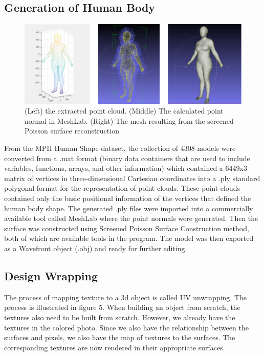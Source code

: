 \documentclass{article}
\begin{document}
    \subsection{Generation of Human Body}
    
    \begin{figure}[h]
        \centering
        \includegraphics{images/humanModel.png}
        \caption{(Left) the extracted point cloud. (Middle) The calculated point normal in MeshLab. (Right) The mesh resulting from the screened Poisson surface reconstruction}
        \label{(Left) the extracted point cloud. (Middle) The calculated point normal in MeshLab. (Right) The mesh resulting from the screened Poisson surface reconstruction(Left) the extracted point cloud. (Middle) The calculated point normal in MeshLab. (Right) The mesh resulting from the screened Poisson surface reconstruction}
    \end{figure}
    From the MPII Human Shape dataset, the collection of 4308 models were converted from a .mat format (binary data containers that are used to include variables, functions, arrays, and other information) which contained a 6449x3 matrix of vertices in three-dimensional Cartesian coordinates into a .ply standard polygonal format for the representation of point clouds. These point clouds contained only the basic positional information of the vertices that defined the human body shape. The generated .ply files were imported into a commercially available tool called MeshLab where the point normals were generated. Then the surface was constructed using Screened Poisson Surface Construction method, both of which are available tools in the program. The model was then exported as a Wavefront object (.obj) and ready for further editing.
    
  
    
    
\subsection{Design Wrapping}

The process of mapping texture to a 3d object is called UV unwrapping. The process is illustrated in figure 5. When building an object from scratch, the textures also need to be built from scratch. However, we already have the textures in the colored photo. Since we also have the relationship between the surfaces and pixels, we also have the map of textures to the surfaces. The corresponding textures are now rendered in their appropriate surfaces.
\end{document}
